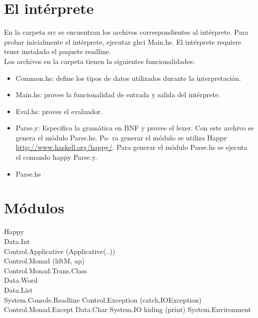 \documentclass[a4paper, 12pt]{article}
\begin{document}
\section*{El intérprete}

En la carpeta src se encuentran los archivos correspondientes al intérprete. Para probar inicialmente el intérprete,
ejecutar ghci Main.hs. El intérprete requiere tener instalado el paquete readline. \\
Los archivos en la carpeta tienen la siguientes funcionalidades:
\begin{itemize}
	\item Common.hs: define los tipos de datos utilizados durante la interpretación.
	\item Main.hs: provee la funcionalidad de entrada y salida del intérprete.
	\item Eval.hs: provee el evaluador.
	\item Parse.y: Especifica la gramática en BNF y provee el lexer. Con este archivo se genera el módulo Parse.hs. Pa-
	ra generar el módulo se utiliza Happy \url{http://www.haskell.org/happy/}. Para generar el módulo Parse.hs
	se ejecuta el comando happy Parse.y.
	\item Parse.hs
\end{itemize}


\section*{Módulos}
Happy \\
Data.Int \\
Control.Applicative (Applicative(..)) \\
Control.Monad (liftM, ap) \\
Control.Monad.Trans.Class \\
Data.Word \\
Data.List \\
System.Console.Readline
Control.Exception (catch,IOException)
Control.Monad.Except
Data.Char
System.IO hiding (print)
System.Environment




\newpage
\nocite{*}
\printbibliography[title={Referencias}]
\end{document}
